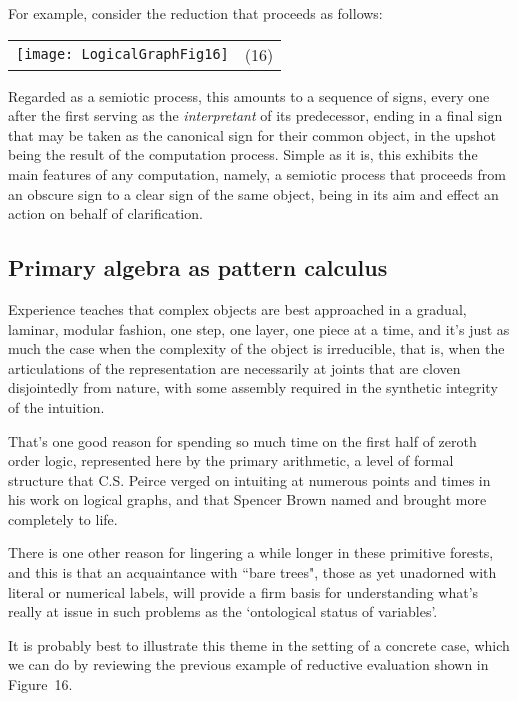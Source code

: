 \documentclass[12pt]{article}
\begin{document}
For example, consider the reduction that proceeds as follows:

\begin{center}\begin{tabular}{cc}
\texttt{[image: LogicalGraphFig16]} & (16) \\
\end{tabular}\end{center}

Regarded as a semiotic process, this amounts to a sequence of signs, every one after the first serving as the \textit{interpretant} of its predecessor, ending in a final sign that may be taken as the canonical sign for their common object, in the upshot being the result of the computation process. Simple as it is, this exhibits the main features of any computation, namely, a semiotic process that proceeds from an obscure sign to a clear sign of the same object, being in its aim and effect an action on behalf of clarification.

\subsection{Primary algebra as pattern calculus}

Experience teaches that complex objects are best approached in a gradual, laminar, modular fashion, one step, one layer, one piece at a time, and it's just as much the case when the complexity of the object is irreducible, that is, when the articulations of the representation are necessarily at joints that are cloven disjointedly from nature, with some assembly required in the synthetic integrity of the intuition.

That's one good reason for spending so much time on the first half of zeroth order logic, represented here by the primary arithmetic, a level of formal structure that C.S. Peirce verged on intuiting at numerous points and times in his work on logical graphs, and that Spencer Brown named and brought more completely to life.

There is one other reason for lingering a while longer in these primitive forests, and this is that an acquaintance with ``bare trees", those as yet unadorned with literal or numerical labels, will provide a firm basis for understanding what's really at issue in such problems as the `ontological status of variables'.

It is probably best to illustrate this theme in the setting of a concrete case, which we can do by reviewing the previous example of reductive evaluation shown in Figure~16.
\end{document}
